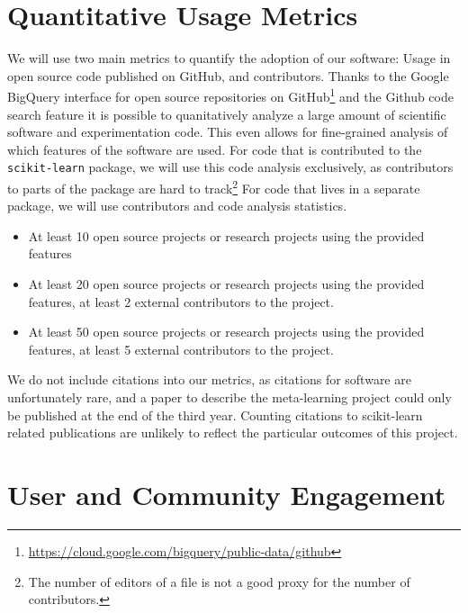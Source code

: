 \documentclass[11pt,letterpaper]{article}
\newcommand{\sklearn}[0]{\texttt{scikit-learn}\xspace}                    %
\begin{document}
\section{Quantitative Usage Metrics}
We will use two main metrics to quantify the adoption of our software:
Usage in open source code published on GitHub, and contributors.
Thanks to the Google BigQuery interface for open source repositories on GitHub\footnote{\url{https://cloud.google.com/bigquery/public-data/github}} and
the Github code search feature it is possible to quanitatively analyze a large
amount of scientific software and experimentation code. This even allows for
fine-grained analysis of which features of the software are used.
For code that is contributed to the \sklearn package, we will use this code
analysis exclusively, as contributors to parts of the package are hard to
track\footnote{The number of editors of a file is not a good proxy for the
number of contributors.} For code that lives in a separate package, we will use
contributors and code analysis statistics.

\begin{itemize}
\item[Year 1] At least 10 open source projects or research projects using the provided features
\item[Year 2] At least 20 open source projects or research projects using the
provided features, at least 2 external contributors to the project.
\item[Year 3] At least 50 open source projects or research projects using the
provided features, at least 5 external contributors to the project.
\end{itemize}
\vspace{10pt}
We do not include citations into our metrics, as citations for software are
unfortunately rare, and a paper to describe the meta-learning project
could only be published at the end of the third year. Counting
citations to scikit-learn related publications are unlikely to reflect
the particular outcomes of this project.

\section{User and Community Engagement}
\end{document}
